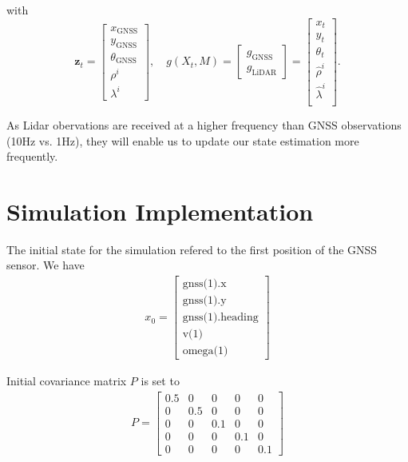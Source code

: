 \documentclass[conference]{IEEEtran}
\begin{document}
with
\[
\mathbf{z}_t =
\begin{bmatrix}
x_\text{GNSS} \\
y_\text{GNSS} \\
\theta_\text{GNSS} \\
\rho^{i} \\
\lambda^{i}
\end{bmatrix}, \quad
g(X_t, M) =
\begin{bmatrix}
g_\text{GNSS} \\
g_\text{LiDAR}
\end{bmatrix} = 
\begin{bmatrix}
x_t \\
y_t \\
\theta_t \\
\hat{\rho}^{i} \\
\hat{\lambda}^{i} \\
\end{bmatrix}.
\]

\vspace{3mm}

\noindent As Lidar obervations are received at a higher frequency than GNSS observations (10Hz vs. 1Hz), they will enable us to update our state estimation more frequently.

\section{Simulation Implementation}

The initial state for the simulation refered to the first position of the GNSS sensor. We have \begin{align*}
   x_0 = \begin{bmatrix}
    \text{gnss(1).x} \\ 
    \text{gnss(1).y} \\
    \text{gnss(1).heading} \\
    \text{v(1)} \\
    \text{omega(1)}
    \end{bmatrix}
\end{align*}

\noindent Initial covariance matrix $P$ is set to
\begin{align*}
   P = \begin{bmatrix}
    0.5 & 0 & 0 & 0 & 0 \\ 
    0 & 0.5 & 0 & 0 & 0 \\
    0 & 0 & 0.1 & 0 & 0 \\
    0 & 0 & 0 & 0.1 & 0 \\
    0 & 0 & 0 & 0 & 0.1
    \end{bmatrix}
\end{align*}
\end{document}
